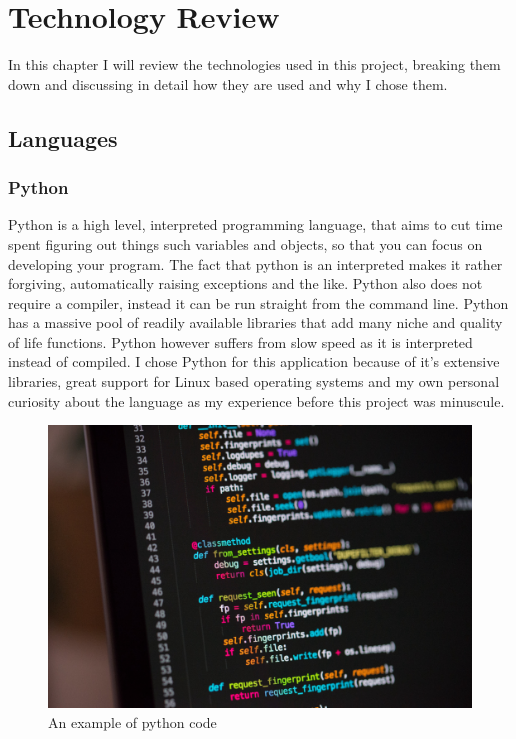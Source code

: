 \chapter{Technology Review}
In this chapter I will review the technologies used in this project, breaking them down and discussing in detail how they are used and why I chose them.
\section{Languages}
\subsection{Python}
Python is a high level, interpreted programming language, that aims to cut time spent figuring out things such variables and objects, so that you can focus on developing your program. The fact that python is an interpreted makes it rather forgiving, automatically raising exceptions and the like. Python also does not require a compiler, instead it can be run straight from the command line. Python has a massive pool of readily available libraries that add many niche and quality of life functions. Python however suffers from slow speed as it is interpreted instead of compiled. I chose Python for this application because of it's extensive libraries, great support for Linux based operating systems and my own personal curiosity about the language as my experience before this project was minuscule.~\cite{python}
\begin{figure}[!htbp] 
    \centering
    \includegraphics[scale = 0.1]{img/python.png}
    \caption{An example of python code}
    \label{fig:my_label}
\end{figure}

